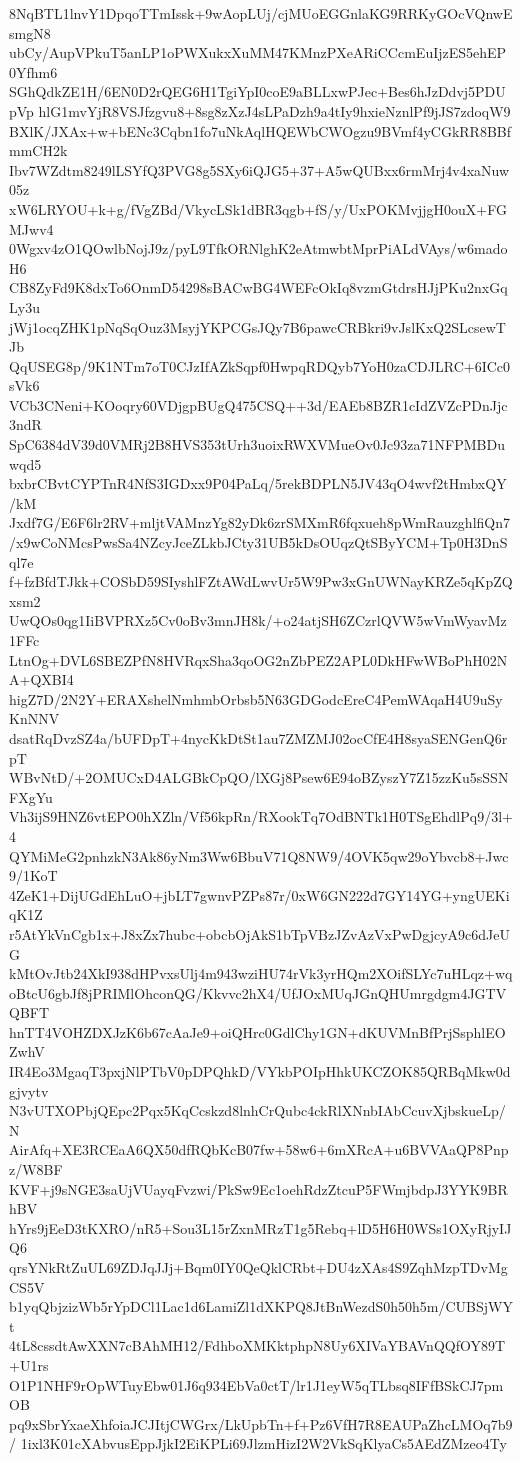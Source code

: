 8NqBTL1lnvY1DpqoTTmIssk+9wAopLUj/cjMUoEGGnlaKG9RRKyGOcVQnwEsmgN8
ubCy/AupVPkuT5anLP1oPWXukxXuMM47KMnzPXeARiCCcmEuIjzES5ehEP0Yfhm6
SGhQdkZE1H/6EN0D2rQEG6H1TgiYpI0coE9aBLLxwPJec+Bes6hJzDdvj5PDUpVp
hlG1mvYjR8VSJfzgvu8+8sg8zXzJ4sLPaDzh9a4tIy9hxieNznlPf9jJS7zdoqW9
BXlK/JXAx+w+bENc3Cqbn1fo7uNkAqlHQEWbCWOgzu9BVmf4yCGkRR8BBfmmCH2k
Ibv7WZdtm8249lLSYfQ3PVG8g5SXy6iQJG5+37+A5wQUBxx6rmMrj4v4xaNuw05z
xW6LRYOU+k+g/fVgZBd/VkycLSk1dBR3qgb+fS/y/UxPOKMvjjgH0ouX+FGMJwv4
0Wgxv4zO1QOwlbNojJ9z/pyL9TfkORNlghK2eAtmwbtMprPiALdVAys/w6madoH6
CB8ZyFd9K8dxTo6OnmD54298sBACwBG4WEFcOkIq8vzmGtdrsHJjPKu2nxGqLy3u
jWj1ocqZHK1pNqSqOuz3MsyjYKPCGsJQy7B6pawcCRBkri9vJslKxQ2SLcsewTJb
QqUSEG8p/9K1NTm7oT0CJzIfAZkSqpf0HwpqRDQyb7YoH0zaCDJLRC+6ICc0sVk6
VCb3CNeni+KOoqry60VDjgpBUgQ475CSQ++3d/EAEb8BZR1cIdZVZcPDnJjc3ndR
SpC6384dV39d0VMRj2B8HVS353tUrh3uoixRWXVMueOv0Jc93za71NFPMBDuwqd5
bxbrCBvtCYPTnR4NfS3IGDxx9P04PaLq/5rekBDPLN5JV43qO4wvf2tHmbxQY/kM
Jxdf7G/E6F6lr2RV+mljtVAMnzYg82yDk6zrSMXmR6fqxueh8pWmRauzghlfiQn7
/x9wCoNMcsPwsSa4NZcyJceZLkbJCty31UB5kDsOUqzQtSByYCM+Tp0H3DnSql7e
f+fzBfdTJkk+COSbD59SIyshlFZtAWdLwvUr5W9Pw3xGnUWNayKRZe5qKpZQxsm2
UwQOs0qg1IiBVPRXz5Cv0oBv3mnJH8k/+o24atjSH6ZCzrlQVW5wVmWyavMz1FFc
LtnOg+DVL6SBEZPfN8HVRqxSha3qoOG2nZbPEZ2APL0DkHFwWBoPhH02NA+QXBI4
higZ7D/2N2Y+ERAXshelNmhmbOrbsb5N63GDGodcEreC4PemWAqaH4U9uSyKnNNV
dsatRqDvzSZ4a/bUFDpT+4nycKkDtSt1au7ZMZMJ02ocCfE4H8syaSENGenQ6rpT
WBvNtD/+2OMUCxD4ALGBkCpQO/lXGj8Psew6E94oBZyszY7Z15zzKu5sSSNFXgYu
Vh3ijS9HNZ6vtEPO0hXZln/Vf56kpRn/RXookTq7OdBNTk1H0TSgEhdlPq9/3l+4
QYMiMeG2pnhzkN3Ak86yNm3Ww6BbuV71Q8NW9/4OVK5qw29oYbvcb8+Jwc9/1KoT
4ZeK1+DijUGdEhLuO+jbLT7gwnvPZPs87r/0xW6GN222d7GY14YG+yngUEKiqK1Z
r5AtYkVnCgb1x+J8xZx7hubc+obcbOjAkS1bTpVBzJZvAzVxPwDgjcyA9c6dJeUG
kMtOvJtb24XkI938dHPvxsUlj4m943wziHU74rVk3yrHQm2XOifSLYc7uHLqz+wq
oBtcU6gbJf8jPRIMlOhconQG/Kkvvc2hX4/UfJOxMUqJGnQHUmrgdgm4JGTVQBFT
hnTT4VOHZDXJzK6b67cAaJe9+oiQHrc0GdlChy1GN+dKUVMnBfPrjSsphlEOZwhV
IR4Eo3MgaqT3pxjNlPTbV0pDPQhkD/VYkbPOIpHhkUKCZOK85QRBqMkw0dgjvytv
N3vUTXOPbjQEpc2Pqx5KqCcskzd8lnhCrQubc4ckRlXNnbIAbCcuvXjbskueLp/N
AirAfq+XE3RCEaA6QX50dfRQbKcB07fw+58w6+6mXRcA+u6BVVAaQP8Pnpz/W8BF
KVF+j9sNGE3saUjVUayqFvzwi/PkSw9Ec1oehRdzZtcuP5FWmjbdpJ3YYK9BRhBV
hYrs9jEeD3tKXRO/nR5+Sou3L15rZxnMRzT1g5Rebq+lD5H6H0WSs1OXyRjyIJQ6
qrsYNkRtZuUL69ZDJqJJj+Bqm0IY0QeQklCRbt+DU4zXAs4S9ZqhMzpTDvMgCS5V
b1yqQbjzizWb5rYpDCl1Lac1d6LamiZl1dXKPQ8JtBnWezdS0h50h5m/CUBSjWYt
4tL8cssdtAwXXN7cBAhMH12/FdhboXMKktphpN8Uy6XIVaYBAVnQQfOY89T+U1rs
O1P1NHF9rOpWTuyEbw01J6q934EbVa0ctT/lr1J1eyW5qTLbsq8IFfBSkCJ7pmOB
pq9xSbrYxaeXhfoiaJCJItjCWGrx/LkUpbTn+f+Pz6VfH7R8EAUPaZhcLMOq7b9/
1ixl3K01cXAbvusEppJjkI2EiKPLi69JlzmHizI2W2VkSqKlyaCs5AEdZMzeo4Ty
